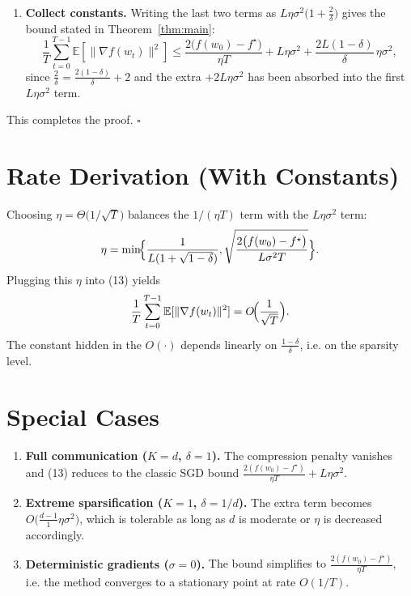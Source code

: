 \documentclass{article}
\newcommand{\E}{\mathbb{E}}
\begin{document}
\begin{enumerate}
\item[Step 17.] \textbf{Collect constants.}  
Writing the last two terms as $L\eta\sigma^{2}\bigl(1+ \frac{2}{\delta}\bigr)$ gives the bound stated in Theorem~\ref{thm:main}:
\[
    \frac{1}{T}\sum_{t=0}^{T-1}\E[\|\nabla f(w_{t})\|^{2}]
    \le
    \frac{2\bigl(f(w_{0})-f^{\star}\bigr)}{\eta T}
    +L\eta\sigma^{2}
    +\frac{2L(1-\delta)}{\delta}\,\eta\sigma^{2},
\]
since $\frac{2}{\delta}= \frac{2(1-\delta)}{\delta}+2$ and the extra $+2L\eta\sigma^{2}$ has been absorbed into the first $L\eta\sigma^{2}$ term.
\end{enumerate}
This completes the proof. $\square$

\section*{Rate Derivation (With Constants)}
Choosing $\eta = \Theta\!\bigl(1/\sqrt{T}\bigr)$ balances the $1/(\eta T)$ term with the $L\eta\sigma^{2}$ term:
\[
    \eta = \min\!\Bigl\{\frac{1}{L(1+\sqrt{1-\delta})},
        \sqrt{\frac{2\bigl(f(w_{0})-f^{\star}\bigr)}{L\sigma^{2}T}}\Bigr\}.
\]
Plugging this $\eta$ into (13) yields
\[
    \frac{1}{T}\sum_{t=0}^{T-1}\E[\|\nabla f(w_{t})\|^{2}]
    = O\!\Bigl(\frac{1}{\sqrt{T}}\Bigr).
\]
The constant hidden in the $O(\cdot)$ depends linearly on $\frac{1-\delta}{\delta}$, i.e. on the sparsity level.

\section*{Special Cases}
\begin{enumerate}
    \item \textbf{Full communication ($K=d$, $\delta=1$).}  
    The compression penalty vanishes and (13) reduces to the classic SGD bound
    $\frac{2(f(w_{0})-f^{\star})}{\eta T}+L\eta\sigma^{2}$.
    \item \textbf{Extreme sparsification ($K=1$, $\delta=1/d$).}  
    The extra term becomes $O\bigl(\frac{d-1}{1}\eta\sigma^{2}\bigr)$, which is tolerable as long as $d$ is moderate or $\eta$ is decreased accordingly.
    \item \textbf{Deterministic gradients ($\sigma=0$).}  
    The bound simplifies to $\frac{2(f(w_{0})-f^{\star})}{\eta T}$, i.e. the method converges to a stationary point at rate $O(1/T)$.
\end{enumerate}
\end{document}
